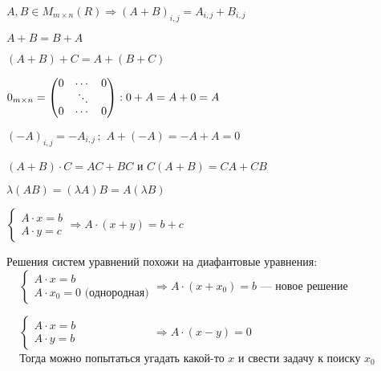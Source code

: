 \quad

\begin{definition}
    $A,B\in M_{m \times n}(R) \Longrightarrow (A+B)_{i,j} = A_{i,j}+B_{i,j}$
\end{definition}

\quad

\begin{properties} 
    \item $A+B = B+A$ 
    \item $(A + B) + C = A + (B + C)$
    \item $0_{m \times n} = \begin{pmatrix}
        0&\cdots&0\\
        &\rotatebox{135}{$\cdots$}\\
        0&\cdots&0
    \end{pmatrix} : 0 + A = A + 0 = A$ 
    \item $(-A)_{i,j} = -A_{i, j}\,;\,\, A + (-A) = -A + A = 0$
    \item $(A + B) \cdot C = A C + B C$ и $C ( A + B) = CA + CB$
\end{properties}

\quad

\begin{remark}
    $\lambda (A B) = (\lambda A)B = A (\lambda B)$
\end{remark}

\quad

\begin{remark}
    $
\begin{cases}
    A \cdot x = b \\
    A \cdot y = c
\end{cases} \Longrightarrow A \cdot (x + y) = b + c
$
\end{remark}

\newpage 
\begin{remark} Решения систем уравнений похожи на диафантовые уравнения:\\

\quad\quad\quad\quad\quad\,\,\,\,\,    $
\begin{cases}
    A \cdot x = b \\
    A \cdot x_0 = 0 \text{ (однородная)}
\end{cases} \Longrightarrow A \cdot (x + x_0) = b
$     --- новое решение

\quad\quad\quad\quad\quad\,\,\,\,\,
$
\begin{cases}
    A \cdot x = b \\
    A \cdot y = b 
\end{cases} \quad \quad\quad\quad\quad\quad\,\,\, \Longrightarrow A \cdot (x - y) = 0
$     
\\

\quad\quad\quad\quad\quad\,\,\,\,\, Тогда можно попытаться угадать какой-то $x$ и свести задачу к поиску $x_0$
\end{remark}


